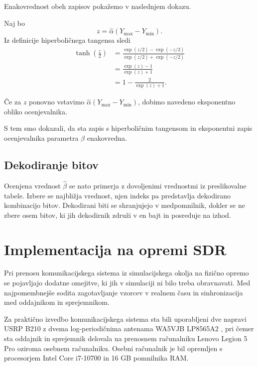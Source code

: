 \documentclass[a4paper, 12pt, openany]{book}
\begin{document}
Enakovrednost obeh zapisov pokažemo v naslednjem dokazu.

\begin{tcolorbox}[colback=red!5!white,colframe=red!50!black,title=Dokaz 2: Enakovrednost zapisov ocenjevalnika parametra $\beta$]
Naj bo
\[
z=\hat{\alpha}(Y_{\max}-Y_{\min}).
\]
Iz definicije hiperboličnega tangensa sledi
\[
\begin{aligned}
\tanh\!\left(\frac{z}{2}\right)
&=
\frac{\exp(z/2)-\exp(-z/2)}
{\exp(z/2)+\exp(-z/2)} \\
&=
\frac{\exp(z)-1}{\exp(z)+1} \\
&=
1-
\frac{2}{\exp(z)+1}.
\end{aligned}
\]

Če za $z$ ponovno vstavimo $\hat{\alpha}(Y_{\max}-Y_{\min})$, dobimo navedeno eksponentno obliko ocenjevalnika.
\end{tcolorbox}
S tem smo dokazali, da sta zapis s hiperboličnim tangensom in eksponentni zapis ocenjevalnika parametra $\beta$ enakovredna.

\subsection{Dekodiranje bitov}
Ocenjena vrednost $\hat{\beta}$ se nato primerja z dovoljenimi vrednostmi iz preslikovalne tabele. Izbere se najbližja vrednost, njen indeks pa predstavlja dekodirano kombinacijo bitov. Dekodirani biti se shranjujejo v medpomnilnik, dokler se ne zbere osem bitov, ki jih dekodirnik združi v en bajt in posreduje na izhod.

\section{Implementacija na opremi SDR}

Pri prenosu komunikacijskega sistema iz simulacijskega okolja na fizično opremo se pojavljajo dodatne omejitve, ki jih v simulaciji ni bilo treba obravnavati. Med najpomembnejše sodita zagotavljanje vzorcev v realnem času in sinhronizacija med oddajnikom in sprejemnikom.

Za praktično izvedbo komunikacijskega sistema sta bili uporabljeni dve napravi USRP B210 \cite{ettusB210} z dvema log-periodičnima antenama WA5VJB LP8565A2 \cite{wa5vjbLP8565A2}, pri čemer sta oddajnik in sprejemnik delovala na prenosnem računalniku Lenovo Legion 5 Pro oziroma osebnem računalniku. Osebni računalnik je bil opremljen s procesorjem Intel Core i7-10700 in 16 GB pomnilnika RAM.
\end{document}
